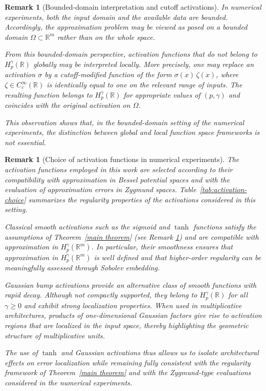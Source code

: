 \documentclass[11pt,reqno]{amsart}
\numberwithin{equation}{section}
\newtheorem{remark}[theorem]{\bf{Remark}}
\theoremstyle{remark}
\theoremstyle{definition}
\begin{document}
\begin{remark}[Bounded-domain interpretation and cutoff activations]
\label{rem:bounded-domain-activation}
In numerical experiments, both the input domain and the available data are bounded.
Accordingly, the approximation problem may be viewed as posed on a bounded domain
$\Omega \subset \mathbb{R}^m$ rather than on the whole space.

From this bounded-domain perspective, activation functions that do not belong to
$H_p^\gamma(\mathbb{R})$ globally may be interpreted locally.
More precisely, one may replace an activation $\sigma$ by a cutoff-modified function of the
form $\sigma(x)\,\zeta(x)$, where $\zeta\in C_c^\infty(\mathbb{R})$ is identically equal to one
on the relevant range of inputs.
The resulting function belongs to $H_p^\gamma(\mathbb{R})$ for appropriate values of
$(p,\gamma)$ and coincides with the original activation on $\Omega$.

This observation shows that, in the bounded-domain setting of the numerical experiments, the distinction between global and local function space frameworks is not essential.
\end{remark}


\begin{remark}[Choice of activation functions in numerical experiments]
\label{rem:activation-choice}
The activation functions employed in this work are selected according to their compatibility
with approximation in Bessel potential spaces and with the evaluation of approximation errors
in Zygmund spaces.
Table~\ref{tab:activation-choice} summarizes the regularity properties of the activations
considered in this setting.

Classical smooth activations such as the sigmoid and $\tanh$ functions satisfy the
assumptions of Theorem~\ref{main theorem} (see Remark \ref{rem:bounded-domain-activation}) and are compatible with approximation in
$H_p^\gamma(\mathbb{R}^m)$.
In particular, their smoothness ensures that approximation in $H_p^\gamma(\mathbb{R}^m)$ is well defined
and that higher-order regularity can be meaningfully assessed through Sobolev embedding.

Gaussian bump activations provide an alternative class of smooth functions with rapid decay.
Although not compactly supported, they belong to $H_p^\gamma(\mathbb{R})$ for all
$\gamma \ge 0$ and exhibit strong localization properties.
When used in multiplicative architectures, products of one-dimensional Gaussian factors
give rise to activation regions that are localized in the input space, thereby
highlighting the geometric structure of multiplicative units.

The use of $\tanh$ and Gaussian activations thus allows us to isolate architectural effects
on error localization while remaining fully consistent with the regularity framework of
Theorem~\ref{main theorem} and with the Zygmund-type evaluations considered in the numerical
experiments.
\end{remark}
\end{document}
